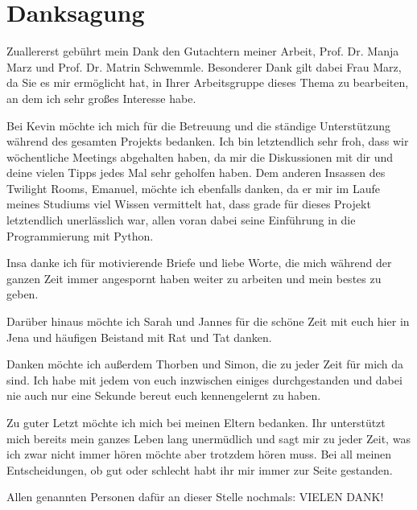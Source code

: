 \chapter*{Danksagung}

Zuallererst gebührt mein Dank den Gutachtern meiner Arbeit, Prof. Dr. Manja Marz und Prof. Dr. Matrin Schwemmle. Besonderer Dank gilt dabei Frau Marz, da Sie es mir ermöglicht hat, in Ihrer Arbeitsgruppe dieses Thema zu bearbeiten, an dem ich sehr großes Interesse habe.

\vspace{1em}

Bei Kevin möchte ich mich für die Betreuung und die ständige Unterstützung während des gesamten Projekts bedanken. Ich bin letztendlich sehr froh, dass wir wöchentliche Meetings abgehalten haben, da mir die Diskussionen mit dir und deine vielen Tipps jedes Mal sehr geholfen haben. Dem anderen Insassen des Twilight Rooms, Emanuel, möchte ich ebenfalls danken, da er mir im Laufe meines Studiums viel Wissen vermittelt hat, dass grade für dieses Projekt letztendlich unerlässlich war, allen voran dabei seine Einführung in die Programmierung mit Python.

\vspace{1em}

Insa danke ich für motivierende Briefe und liebe Worte, die mich während der ganzen Zeit immer angespornt haben weiter zu arbeiten und mein bestes zu geben. 

\vspace{1em}

Darüber hinaus möchte ich Sarah und Jannes für die schöne Zeit mit euch hier in Jena und häufigen Beistand mit Rat und Tat danken. 

\vspace{1em}

Danken möchte ich außerdem Thorben und Simon, die zu jeder Zeit für mich da sind. Ich habe mit jedem von euch inzwischen einiges durchgestanden und dabei nie auch nur eine Sekunde bereut euch kennengelernt zu haben. %

\vspace{1em}

Zu guter Letzt möchte ich mich bei meinen Eltern bedanken. Ihr unterstützt mich bereits mein ganzes Leben lang unermüdlich und sagt mir zu jeder Zeit, was ich zwar nicht immer hören möchte aber trotzdem hören muss. Bei all meinen Entscheidungen, ob gut oder schlecht habt ihr mir immer zur Seite gestanden. 

\vspace{1em}

Allen genannten Personen dafür an dieser Stelle nochmals: VIELEN DANK!